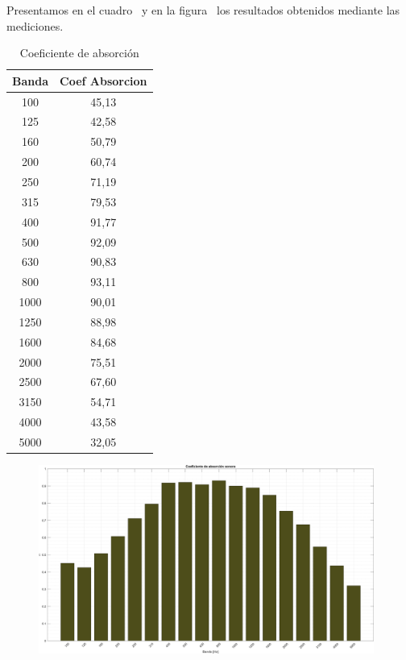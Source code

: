 \par Presentamos en el cuadro~ y en la figura~ los resultados obtenidos mediante las mediciones.


\begin{table}[]
\setlength\arrayrulewidth{1pt}
    \centering
    \begin{tabular}{|c|c|} \hline
        \textbf{Banda} & Coef Absorcion \\ \hline \hline
        100 & 45,13\\ \hline
        125	& 42,58\\ \hline
        160	& 50,79\\ \hline
        200	& 60,74\\ \hline
        250	& 71,19\\ \hline
        315	& 79,53\\ \hline
        400	& 91,77\\ \hline
        500	& 92,09\\ \hline
        630	& 90,83\\ \hline
        800	& 93,11\\ \hline
        1000&	90,01\\ \hline
        1250&	88,98\\ \hline
        1600&	84,68\\ \hline
        2000&	75,51\\ \hline
        2500&	67,60\\ \hline
        3150&	54,71\\ \hline
        4000&	43,58\\ \hline
        5000&	32,05\\ \hline
    \end{tabular}
    \caption{Coeficiente de absorción}
    \label{tab:coef_absorcion_sonora}
\end{table}



\begin{figure}[H]
	\centering
	\includegraphics[width=0.98\textwidth]{./img/Coef_absorcion_sonora_bars.png}
	\caption{}
	\label{fig::coef_absorcion_sonora}
\end{figure}


